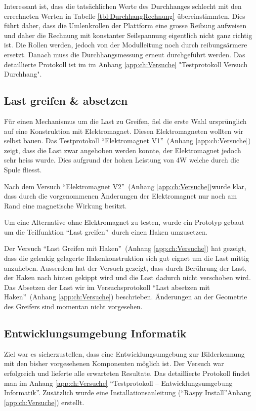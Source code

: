 \documentclass[a4paper]{report}
\begin{document}
Interessant ist, dass die tatsächlichen Werte des Durchhanges schlecht mit den errechneten Werten in Tabelle \ref{tbl:DurchhangRechnung} übereinstimmten. Dies führt daher, dass die Umlenkrollen der Plattform eine grosse Reibung aufweisen und daher die Rechnung mit konstanter Seilspannung eigentlich nicht ganz richtig ist. Die Rollen werden, jedoch von der Modulleitung noch durch reibungsärmere ersetzt. Danach muss die Durchhangsmessung erneut durchgeführt werden. Das detaillierte Protokoll ist im im Anhang \ref{app:ch:Versuche} "Testprotokoll Versuch Durchhang".

\subsection{Last greifen \& absetzen}
\label{ssec:VersLastg}

Für einen Mechanismus um die Last zu Greifen, fiel die erste Wahl ursprünglich auf eine Konstruktion mit Elektromagnet. Diesen Elektromagneten wollten wir selbst bauen. Das Testprotokoll \textquotedblleft Elektromagnet V1\textquotedblright\ (Anhang \ref{app:ch:Versuche}) zeigt, dass die Last zwar angehoben werden konnte, der Elektromagnet jedoch sehr heiss wurde. Dies aufgrund der hohen Leistung von 4W welche durch die Spule fliesst.

Nach dem Versuch \textquotedblleft Elektromagnet V2\textquotedblright\ (Anhang \ref{app:ch:Versuche})wurde klar, dass durch die vorgenommenen Änderungen der Elektromagnet nur noch am Rand eine magnetische Wirkung besitzt.

Um eine Alternative ohne Elektromagnet zu testen, wurde ein Prototyp gebaut um die Teilfunktion \textquotedblleft Last greifen\textquotedblright\ durch einen Haken umzusetzen.

Der Versuch \textquotedblleft Last Greifen mit Haken\textquotedblright\ (Anhang \ref{app:ch:Versuche}) hat gezeigt, dass die gelenkig gelagerte Hakenkonstruktion sich gut eignet um die Last mittig anzuheben. Ausserdem hat der Versuch gezeigt, dass durch Berührung der Last, der Haken nach hinten gekippt wird und die Last dadurch nicht verschoben wird. Das Absetzen der Last wir im Versuchsprotokoll \textquotedblleft Last absetzen mit Haken\textquotedblright\ (Anhang \ref{app:ch:Versuche}) beschrieben. Änderungen an der Geometrie des Greifers sind momentan nicht vorgesehen.

\subsection{Entwicklungsumgebung Informatik}
\label{ssec:VersEntI}
Ziel war es sicherzustellen, dass eine Entwicklungsumgebung zur Bilderkennung mit den bisher vorgesehenen Komponenten möglich ist. Der Versuch war erfolgreich und lieferte alle erwarteten Resultate. Das detaillierte Protokoll findet man im Anhang \ref{app:ch:Versuche} \textquotedblleft Testprotokoll – Entwicklungsumgebung Informatik\textquotedblright.
Zusätzlich wurde eine Installationsanleitung (\textquotedblleft Raspy Install\textquotedblright Anhang \ref{app:ch:Versuche}) erstellt.
\end{document}
